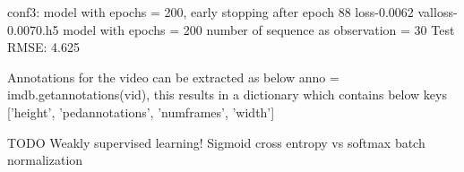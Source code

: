 conf3:
model with epochs = 200, early stopping after epoch 88
loss-0.0062 val\textunderscore loss-0.0070.h5
model with epochs = 200
number of sequence as observation = 30
Test RMSE: 4.625


Annotations for the video can be extracted as below
anno = imdb.\textunderscore get\textunderscore annotations(vid), this results in a dictionary which contains below keys ['height', 'ped\textunderscore annotations', 'num\textunderscore frames', 'width']

TODO
\newpara Weakly supervised learning!
Sigmoid cross entropy vs  softmax
batch normalization
